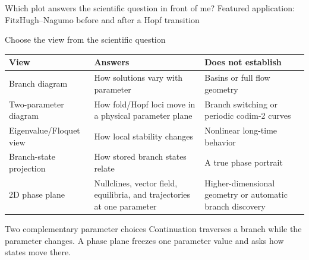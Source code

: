   {Which plot answers the scientific question in front of me?}
  {Featured application: FitzHugh--Nagumo before and after a Hopf transition}

\begin{frame}{Choose the view from the scientific question}
\scriptsize
\centering
\renewcommand{\arraystretch}{1.28}
\setlength{\tabcolsep}{3.5pt}
\begin{tabular}{@{}>{\raggedright\arraybackslash}p{}
                  >{\raggedright\arraybackslash}p{}
                  >{\raggedright\arraybackslash}p{}@{}}
\toprule
View & Answers & Does not establish\\
\midrule
Branch diagram
  & How solutions vary with parameter
  & Basins or full flow geometry\\
Two-parameter diagram
  & How fold/Hopf loci move in a physical parameter plane
  & Branch switching or periodic codim-2 curves\\
Eigenvalue/Floquet view
  & How local stability changes
  & Nonlinear long-time behavior\\
Branch-state projection
  & How stored branch states relate
  & A true phase portrait\\
2D phase plane
  & Nullclines, vector field, equilibria, and trajectories at one parameter
  & Higher-dimensional geometry or automatic branch discovery\\
\bottomrule
\end{tabular}
\vspace{3mm}
\begin{block}{Two complementary parameter choices}
Continuation traverses a branch while the parameter changes. A phase plane
freezes one parameter value and asks how states move there.
\end{block}
\end{frame}

